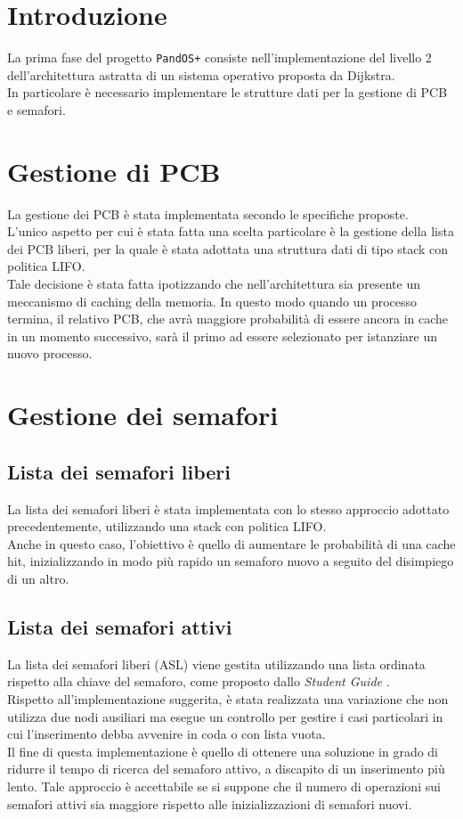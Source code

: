 \documentclass[11pt]{article}
\begin{document}
\newpage

\section{Introduzione}
La prima fase del progetto \texttt{PandOS+} consiste nell'implementazione del livello 2 dell'architettura astratta di un sistema operativo proposta da Dijkstra.\\
In particolare è necessario implementare le strutture dati per la gestione di PCB e semafori.

\section{Gestione di PCB}
La gestione dei PCB è stata implementata secondo le specifiche proposte. \\
L'unico aspetto per cui è stata fatta una scelta particolare è la gestione della lista dei PCB liberi, per la quale è stata adottata una struttura dati di tipo stack con politica LIFO.\\
Tale decisione è stata fatta ipotizzando che nell'architettura sia presente un meccanismo di caching della memoria. In questo modo quando un processo termina, 
il relativo PCB, che avrà maggiore probabilità di essere ancora in cache in un momento successivo, sarà il primo ad essere selezionato per istanziare un nuovo processo.

\section{Gestione dei semafori}
\subsection{Lista dei semafori liberi}
La lista dei semafori liberi è stata implementata con lo stesso approccio adottato precedentemente, utilizzando una stack con politica LIFO. \\
Anche in questo caso, l'obiettivo è quello di aumentare le probabilità di una cache hit, inizializzando in modo più rapido un semaforo nuovo a seguito del disimpiego di un altro.

\subsection{Lista dei semafori attivi}
La lista dei semafori liberi (ASL) viene gestita utilizzando una lista ordinata rispetto alla chiave del semaforo, come proposto dallo \textit{Student Guide} \cite{1}. \\
Rispetto all'implementazione suggerita, è stata realizzata una variazione che non utilizza due nodi ausiliari ma esegue un controllo per gestire i casi particolari in cui l'inserimento debba avvenire in coda o con lista vuota.\\
Il fine di questa implementazione è quello di ottenere una soluzione in grado di ridurre il tempo di ricerca del semaforo attivo, a discapito di un inserimento più lento.
Tale approccio è accettabile se si suppone che il numero di operazioni sui semafori attivi sia maggiore rispetto alle inizializzazioni di semafori nuovi.

\newpage
\printbibliography[title={Bibliografia}]
\end{document}

